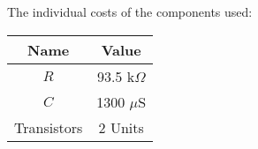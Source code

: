 The individual costs of the components used: 

\begin{center}
  \begin{tabular}{ | c | c | }
    \hline    
    {\bf Name} & {\bf Value} \\ \hline
    $R$ & 93.5 k$\Omega$ \\ \hline 
    $C$ & 1300 $\mu$S \\ \hline
    Transistors & 2 Units \\ 
    \hline
  \end{tabular}
\end{center}



